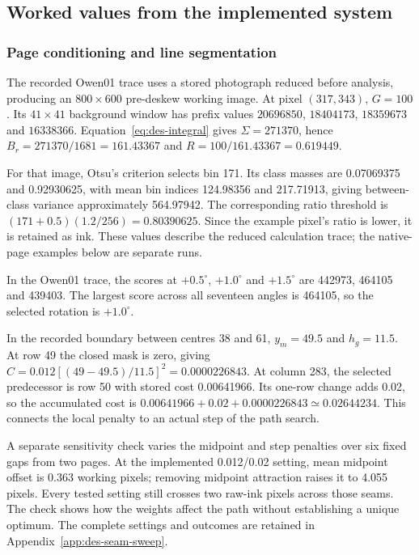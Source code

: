 \subsection{Worked values from the implemented system}\label{app:worked-design-calculations}

\subsubsection{Page conditioning and line segmentation}
The recorded Owen01 trace uses a stored photograph reduced before analysis, producing an $800\times600$ pre-deskew working image. At pixel $(317,343)$, $G=100$. Its $41\times41$ background window has prefix values $20696850$, $18404173$, $18359673$ and $16338366$. Equation~\ref{eq:des-integral} gives $\Sigma=271370$, hence $B_r=271370/1681=161.43367$ and $R=100/161.43367=0.619449$.

For that image, Otsu's criterion selects bin 171. Its class masses are 0.07069375 and 0.92930625, with mean bin indices 124.98356 and 217.71913, giving between-class variance approximately 564.97942. The corresponding ratio threshold is $(171+0.5)(1.2/256)=0.80390625$. Since the example pixel's ratio is lower, it is retained as ink. These values describe the reduced calculation trace; the native-page examples below are separate runs.

In the Owen01 trace, the scores at $+0.5^\circ$, $+1.0^\circ$ and $+1.5^\circ$ are 442973, 464105 and 439403. The largest score across all seventeen angles is 464105, so the selected rotation is $+1.0^\circ$.

In the recorded boundary between centres 38 and 61, $y_m=49.5$ and $h_g=11.5$. At row 49 the closed mask is zero, giving $C=0.012[(49-49.5)/11.5]^2=0.0000226843$. At column 283, the selected predecessor is row 50 with stored cost 0.00641966. Its one-row change adds 0.02, so the accumulated cost is $0.00641966+0.02+0.0000226843\simeq0.02644234$. This connects the local penalty to an actual step of the path search.

A separate sensitivity check varies the midpoint and step penalties over six fixed gaps from two pages. At the implemented 0.012/0.02 setting, mean midpoint offset is 0.363 working pixels; removing midpoint attraction raises it to 4.055 pixels. Every tested setting still crosses two raw-ink pixels across those seams. The check shows how the weights affect the path without establishing a unique optimum. The complete settings and outcomes are retained in Appendix~\ref{app:des-seam-sweep}.


